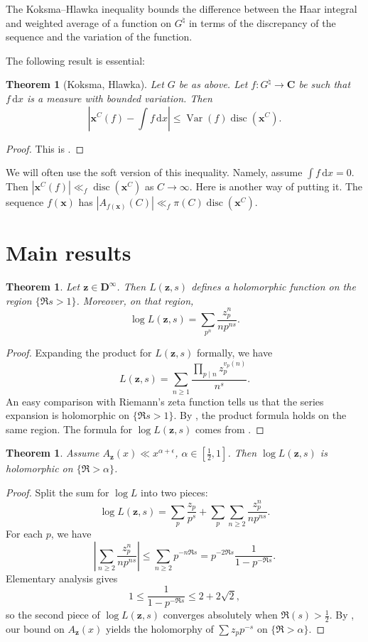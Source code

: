 \documentclass{article}
\DeclareMathOperator{\disc}{disc}
\DeclareMathOperator{\Var}{Var}
\newcommand{\bC}{\mathbf{C}}
\newcommand{\bD}{\mathbf{D}}
\newcommand{\bx}{{\boldsymbol x}}
\newcommand{\bz}{{\boldsymbol z}}
\newcommand{\dd}{\mathrm{d}}
\newtheorem{theorem}[subsection]{Theorem}
\theoremstyle{definition}
\begin{document}
The Koksma--Hlawka inequality bounds the difference between the Haar integral 
and weighted average of a function on $G^\natural$ in terms of the discrepancy 
of the sequence and the variation of the function. 

The following result is essential:

\begin{theorem}[Koksma, Hlawka]
Let $G$ be as above. Let $f\colon G^\natural\to \bC$ be such that $f\, \dd x$ 
is a measure with bounded variation. Then 
\[
	\left|\bx^C(f) - \int f\, \dd x\right| \leqslant \Var(f) \disc(\bx^C) .
\]
\end{theorem}
\begin{proof}
This is \cite[Th.~3.2]{okten-1999}. 
\end{proof}

We will often use the soft version of this inequality. Namely, assume 
$\int f\, \dd x=0$. Then $|\bx^C(f)| \ll_f \disc(\bx^C)$ as $C\to \infty$. 
Here is another way of putting it. The sequence $f(\bx)$ has
$|A_{f(\bx)}(C)| \ll_f \pi(C) \disc(\bx^C)$. 





\section{Main results}\label{sec:prelim-result}

\begin{theorem}
Let $\bz\in \bD^\infty$. Then $L(\bz,s)$ defines a holomorphic 
function on the region $\{\Re s>1\}$. Moreover, on that region, 
\[
	\log L(\bz,s) = \sum_{p^n} \frac{z_p^n}{n p^{n s}} .
\]
\end{theorem}
\begin{proof}
Expanding the product for $L(\bz,s)$ formally, we have 
\[
	L(\bz,s) = \sum_{n\geqslant 1} \frac{\prod_{p\mid n} z_p^{v_p(n)}}{n^s} .
\]
An easy comparison with Riemann's zeta function tells us that the series 
expansion is holomorphic on $\{\Re s>1\}$. By \cite[Th.~11.7]{apostol-1976}, 
the product formula holds on the same region. The formula for 
$\log L(\bz,s)$ comes from \cite[11.9 Ex.2]{apostol-1976}.
\end{proof}

\begin{theorem}\label{thm:main-for-sequences}
Assume $A_\bz(x) \ll x^{\alpha +\epsilon}$, $\alpha\in [\frac 1 2,1]$. 
Then $\log L(\bz,s)$ is holomorphic on $\{\Re>\alpha\}$.
\end{theorem}
\begin{proof}
Split the sum for $\log L$ into two pieces:
\[
	\log L(\bz,s) = \sum_p \frac{z_p}{p^s} + \sum_p \sum_{n\geqslant 2} \frac{z_p^n}{n p^{n s}} .
\]
For each $p$, we have 
\[
	\left|\sum_{n\geqslant 2} \frac{z_p^n}{n p^{ns}} \right| \leqslant \sum_{n\geqslant 2} p^{-n \Re s} = p^{-2\Re s} \frac{1}{1-p^{-\Re s}} .
\]
Elementary analysis gives 
\[
	1 \leqslant \frac{1}{1-p^{-\Re s}} \leqslant 2+2\sqrt 2 ,
\]
so the second piece of $\log L(\bz,s)$ converges absolutely when 
$\Re(s)>\frac 1 2$. By \cite[II.1 Th.10]{tenenbaum-1995}, our bound on 
$A_\bz(x)$ yields the holomorphy of $\sum z_p p^{-s}$ on $\{\Re >\alpha\}$. 
\end{proof}
\end{document}
